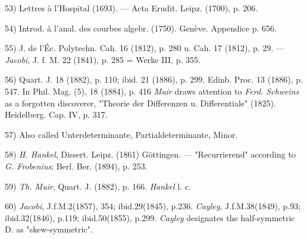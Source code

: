 \vspace{-0.3cm}
\leftline{\rule{2in}{0.4pt}}
\vspace{0.1cm}
{
\footnotesize
53) Lettres à l'Hospital (1693). — Acta Erudit. Leipz. (1700), p. 206.

54) Introd. à l'anal. des courbes algebr. (1750). Genève. Appendice p. 656.

55) J. de l'Éc. Polytechn. Cah. 16 (1812), p. 280 u. Cah. 17 (1812), p. 29. — \textit{Jacobi}, J. f. M. 22 (1841), p. 285 = Werke III, p. 355.

56) Quart. J. 18 (1882), p. 110; ibid. 21 (1886), p. 299. Edinb. Proc. 13 (1886), p. 547. In Phil. Mag. (5), 18 (1884), p. 416 \textit{Muir} draws attention to \textit{Ferd. Schweins} as a forgotten discoverer, "Theorie der Differenzen u. Differentiale" (1825). Heidelberg. Cap. IV, p. 317.

57) Also called Unterdeterminante, Partialdeterminante, Minor.

58) \textit{H. Hankel}, Dissert. Leipz. (1861) Göttingen. — "Recurrierend" according to \textit{G. Frobenius}; Berl. Ber. (1894), p. 253.

59) \textit{Th. Muir}, Quart. J. (1882), p. 166. \textit{Hankel} l. c.

60) \textit{Jacobi}, J.f.M.2(1857), 354; ibid.29(1845), p.236. \textit{Cayley}, J.f.M.38(1849), p.93; ibid.32(1846), p.119; ibid.50(1855), p.299. \textit{Cayley} designates the half-symmetric D. as "skew-symmetric".

}

